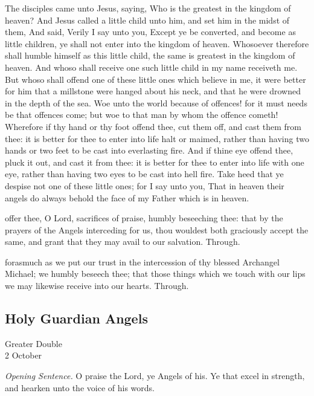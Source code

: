 The disciples came unto Jesus, saying, Who is the greatest in the kingdom of heaven? And Jesus called a little child unto him, and set him in the midst of them, And said, Verily I say unto you, Except ye be converted, and become as little children, ye shall not enter into the kingdom of heaven. Whosoever therefore shall humble himself as this little child, the same is greatest in the kingdom of heaven. And whoso shall receive one such little child in my name receiveth me. But whoso shall offend one of these little ones which believe in me, it were better for him that a millstone were hanged about his neck, and that he were drowned in the depth of the sea. Woe unto the world because of offences! for it must needs be that offences come; but woe to that man by whom the offence cometh! Wherefore if thy hand or thy foot offend thee, cut them off, and cast them from thee: it is better for thee to enter into life halt or maimed, rather than having two hands or two feet to be cast into everlasting fire. And if thine eye offend thee, pluck it out, and cast it from thee: it is better for thee to enter into life with one eye, rather than having two eyes to be cast into hell fire. Take heed that ye despise not one of these little ones; for I say unto you, That in heaven their angels do always behold the face of my Father which is in heaven.


\secret
{} offer thee, O Lord, sacrifices of praise, humbly beseeching thee: that by the prayers of the Angels interceding for us, thou wouldest both graciously accept the same, and grant that they may avail to our salvation. Through.


\postcommunion
{} forasmuch as we put our trust in the intercession of thy blessed Archangel Michael; we humbly beseech thee; that those things which we touch with our lips we may likewise receive into our hearts. Through.


\clearpage
\subsection{Holy Guardian Angels}
\begin{inhead}
	{Greater Double\\
		2 October}
\end{inhead}
\par\noindent
\textit{Opening Sentence.} O praise the Lord, ye Angels of his. Ye that excel in strength, and hearken unto the voice of his words.

